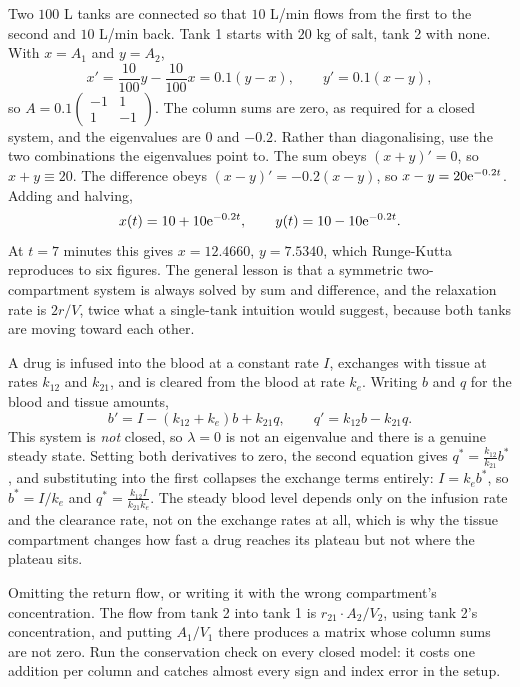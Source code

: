 \begin{worked}
Two $100$ L tanks are connected so that $10$ L/min flows from the first to the second and $10$ L/min back. Tank 1 starts with $20$ kg of salt, tank 2 with none. With $x=A_1$ and $y=A_2$,
\[x'=\frac{10}{100}y-\frac{10}{100}x=0.1(y-x),\qquad y'=0.1(x-y),\]
so $A=0.1\begin{pmatrix}-1&1\\1&-1\end{pmatrix}$. The column sums are zero, as required for a closed system, and the eigenvalues are $0$ and $-0.2$. Rather than diagonalising, use the two combinations the eigenvalues point to. The sum obeys $(x+y)'=0$, so $x+y\equiv20$. The difference obeys $(x-y)'=-0.2(x-y)$, so $x-y=20\mathrm{e}^{-0.2t}$. Adding and halving,
\[x(t)=10+10\mathrm{e}^{-0.2t},\qquad y(t)=10-10\mathrm{e}^{-0.2t}.\]
At $t=7$ minutes this gives $x=12.4660$, $y=7.5340$, which Runge-Kutta reproduces to six figures. The general lesson is that a symmetric two-compartment system is always solved by sum and difference, and the relaxation rate is $2r/V$, twice what a single-tank intuition would suggest, because both tanks are moving toward each other.
\end{worked}

\begin{worked}
A drug is infused into the blood at a constant rate $I$, exchanges with tissue at rates $k_{12}$ and $k_{21}$, and is cleared from the blood at rate $k_e$. Writing $b$ and $q$ for the blood and tissue amounts,
\[b'=I-(k_{12}+k_e)b+k_{21}q,\qquad q'=k_{12}b-k_{21}q.\]
This system is \emph{not} closed, so $\lambda=0$ is not an eigenvalue and there is a genuine steady state. Setting both derivatives to zero, the second equation gives $q^{*}=\frac{k_{12}}{k_{21}}b^{*}$, and substituting into the first collapses the exchange terms entirely: $I=k_eb^{*}$, so $b^{*}=I/k_e$ and $q^{*}=\frac{k_{12}I}{k_{21}k_e}$. The steady blood level depends only on the infusion rate and the clearance rate, not on the exchange rates at all, which is why the tissue compartment changes how fast a drug reaches its plateau but not where the plateau sits.
\end{worked}

\begin{trap}
Omitting the return flow, or writing it with the wrong compartment's concentration. The flow from tank 2 into tank 1 is $r_{21}\cdot A_2/V_2$, using tank 2's concentration, and putting $A_1/V_1$ there produces a matrix whose column sums are not zero. Run the conservation check on every closed model: it costs one addition per column and catches almost every sign and index error in the setup.
\end{trap}

